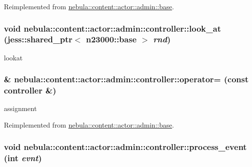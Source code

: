 Reimplemented from \hyperlink{classnebula_1_1content_1_1actor_1_1admin_1_1base_ab7aac539b0e1e06102bbb4b572d529cd}{nebula::content::actor::admin::base}.\hypertarget{classnebula_1_1content_1_1actor_1_1admin_1_1controller_ab59443a22c4da36f6b8996c90cd75c37}{
\subsubsection[{look\_\-at}]{\setlength{\rightskip}{0pt plus 5cm}void nebula::content::actor::admin::controller::look\_\-at (jess::shared\_\-ptr$<$ {\bf n23000::base} $>$ {\em rnd})}}
\label{classnebula_1_1content_1_1actor_1_1admin_1_1controller_ab59443a22c4da36f6b8996c90cd75c37}


lookat \hypertarget{classnebula_1_1content_1_1actor_1_1admin_1_1controller_a4353c8b538a9a5334152f3b3eab5034d}{
\subsubsection[{operator=}]{\& nebula::content::actor::admin::controller::operator= (const {\bf controller} \&)}}
\label{classnebula_1_1content_1_1actor_1_1admin_1_1controller_a4353c8b538a9a5334152f3b3eab5034d}


assignment 

Reimplemented from \hyperlink{classnebula_1_1content_1_1actor_1_1admin_1_1base_a96093c0d52eb68a36b3b80db30c2750c}{nebula::content::actor::admin::base}.\hypertarget{classnebula_1_1content_1_1actor_1_1admin_1_1controller_a0ed008079e8d68dd6b7e271b71c91f29}{
\subsubsection[{process\_\-event}]{\setlength{\rightskip}{0pt plus 5cm}void nebula::content::actor::admin::controller::process\_\-event (int {\em evnt})}}
\label{classnebula_1_1content_1_1actor_1_1admin_1_1controller_a0ed008079e8d68dd6b7e271b71c91f29}



